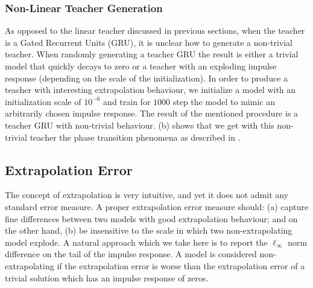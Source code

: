 \subsubsection{Non-Linear Teacher Generation}\label{sec:apdx:gru_teacher_generation}
As opposed to the linear teacher discussed in previous sections, when the teacher is a Gated Recurrent Units (GRU), it is unclear how to generate a non-trivial teacher. When randomly generating a teacher GRU the result is either a trivial model that quickly decays to zero or a teacher with an exploding impulse response (depending on the scale of the initialization). In order to produce a teacher with interesting extrapolation behaviour, we initialize a model with an initialization scale of $10^{-6}$ and train for $1000$ step the model to mimic an arbitrarily chosen impulse response. The result of the mentioned procedure is a teacher GRU with non-trivial behaviour.  (b) shows that we get with this non-trivial teacher the phase transition phenomena as described in .

\subsection{Extrapolation Error}\label{sec:apdx:extrapolation_error}
The concept of extrapolation is very intuitive, and yet it does not admit any standard error measure. A proper extrapolation error measure should: (a) capture fine differences between two models with good extrapolation behaviour; and on the other hand, (b) be insensitive to the scale in which two non-extrapolating model explode. 
A natural approach which we take here is to report the $\ell_{\infty}$ norm difference on the tail of the impulse response. A model is considered non-extrapolating if the extrapolation error is worse than the extrapolation error of a trivial solution which has an impulse response of zeros.